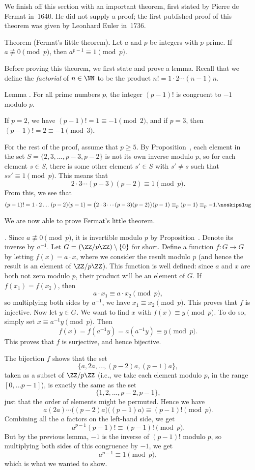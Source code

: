 We finish off this section with an important theorem, first stated by Pierre de Fermat in~1640.
He did not supply a proof; the first published proof of this theorem was given by
Leonhard Euler in~1736.

\edef\thmflt{\the\thmcount}
\parenproclaim Theorem {\advthm} (Fermat's little theorem). Let $a$ and $p$ be integers with $p$ prime.
If $a\not\equiv 0\pmod p$, then $a^{p-1}\equiv 1\pmod p$.

Before proving this theorem, we first state and prove a lemma. Recall that we define the {\it factorial}
of $n\in \NN$ to be the product $n! = 1\cdot 2\cdots (n-1) n$.

\edef\lemhalfwilson{\the\thmcount}
\proclaim Lemma \advthm. For all prime numbers $p$, the integer $(p-1)!$ is congruent to $-1$ modulo $p$.

\proof If $p=2$, we have $(p-1)! = 1\equiv -1\pmod 2$, and if $p=3$, then $(p-1)! = 2 \equiv -1 \pmod 3$.

For the rest of the proof, assume that $p\ge 5$.
By Proposition~{\propselfinversemodp}, each element in the set $S = \{2,3,\ldots,p-3,p-2\}$
is not its own inverse modulo $p$, so for each element $s\in S$, there is some other element $s'\in S$ with
$s'\ne s$ such that $ss'\equiv 1\pmod p$. This means that
$$ 2\cdot 3 \cdots (p-3)(p-2) \equiv 1\pmod p.$$
From this, we see that
$$(p-1)! = 1\cdot 2\ldots (p-2)(p-1) = \bigl(2\cdot 3 \cdots (p-3)(p-2)\bigr)(p-1)
\equiv_p (p-1)\equiv_p -1.\noskipslug$$

We are now able to prove Fermat's little theorem.

\medskip\noindent{\it Proof of Theorem~{\thmflt}}.\enspace
Since $a\not\equiv 0\pmod p$, it is invertible modulo $p$ by Proposition~{\propinvertiblemodp}.
Denote its inverse by $a^{-1}$.
Let $G = (\ZZ/p\ZZ)\setminus\{0\}$ for short. Define a function $f:G\to G$ by letting $f(x) = a\cdot x$,
where we consider the result modulo $p$ (and hence the result is an element of $\ZZ/p\ZZ$).
This function
is well defined: since $a$ and $x$ are both not zero modulo $p$, their product will be an element of $G$.
If $f(x_1) = f(x_2)$, then
$$a\cdot x_1 \equiv a\cdot x_2\pmod p,$$
so multiplying
both sides by $a^{-1}$, we have $x_1 \equiv x_2\pmod p$.
This proves that $f$ is injective. Now let $y\in G$. We want
to find $x$ with $f(x) \equiv y\pmod p$.
To do so, simply set $x \equiv a^{-1}y\pmod p$. Then
$$f(x) = f(a^{-1}y) = a(a^{-1}y) \equiv y \pmod p.$$
This proves that $f$ is surjective, and hence bijective.

The bijection $f$ shows that the set
$$\bigl\{a, 2a, \ldots,(p-2)a, (p-1)a\bigr\},$$
taken as a subset of $\ZZ/p\ZZ$ (i.e., we take each element modulo $p$, in the range $[0,\ldots p-1]$),
is exactly the same as the set
$$\{1, 2, \ldots, p-2, p-1\},$$
just that the order of elements might be permuted. Hence we have
$$a(2a)\cdots\bigl((p-2)a\bigr)\bigl((p-1)a\bigr) \equiv (p-1)!\pmod p.$$
Combining all the $a$ factors on the left-hand side, we get
$$a^{p-1} (p-1)!\equiv (p-1)!\pmod p.$$
But by the previous lemma, $-1$ is the inverse of $(p-1)!$ modulo $p$,
so multiplying both sides of this congruence by $-1$, we get
$$a^{p-1}\equiv 1\pmod p,$$
which is what we wanted to show.\slug

